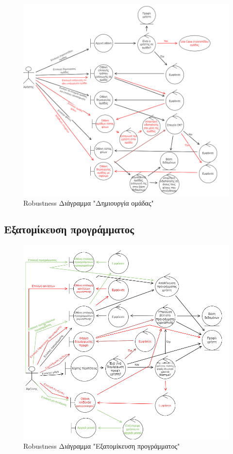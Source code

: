 \begin{figure}[!htb]
  \begin{center}
    \includegraphics[width=\textwidth]{robust_dhmiourgia.png}
    \caption{Robustness Διάγραμμα "Δημιουργία ομάδας"}
    \label{}
     \end{center}
\end{figure}
\newpage


\subsection{Εξατομίκευση προγράμματος}
\begin{figure}[!htb]
  \begin{center}
    \includegraphics[width=\textwidth]{robust_eksatom.png}
    \caption{Robustness Διάγραμμα "Εξατομίκευση προγράμματος"}
    \label{}
     \end{center}
\end{figure}
\newpage


